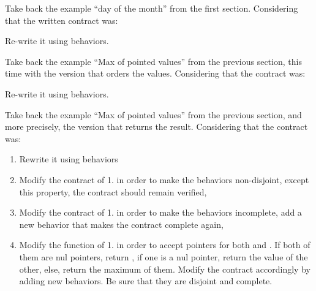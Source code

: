 Take back the example ``day of the month'' from the first section.
Considering that the written contract was:





Re-write it using behaviors.





Take back the example ``Max of pointed values'' from the previous section,
this time with the version that orders the values. Considering that the
contract was:






Re-write it using behaviors.






Take back the example ``Max of pointed values'' from the previous section,
and more precisely, the version that returns the result. Considering that
the contract was:






\begin{enumerate}
\item Rewrite it using behaviors
\item Modify the contract of 1. in order to make the behaviors non-disjoint,
  except this property, the contract should remain verified,
\item Modify the contract of 1. in order to make the behaviors incomplete,
  add a new behavior that makes the contract complete again,
\item Modify the function of 1. in order to accept  pointers
  for both  and . If both of them are nul pointers,
  return , if one is a nul pointer, return the value of
  the other, else, return the maximum of them. Modify the contract accordingly
  by adding new behaviors. Be sure that they are disjoint and complete.
\end{enumerate}
